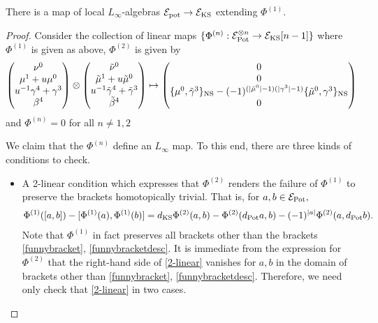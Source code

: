 \documentclass[11pt]{amsart}
\begin{document}
\begin{prop}
There is a map of local $L_{\infty}$-algebras $\mathcal E_{\rm pot}\to \mathcal E_{\rm KS}$ extending $\Phi^{(1)}$.
\end{prop}
\begin{proof}
  Consider the collection of linear maps $\{\Phi^{(n)}: \mathcal E_{\rm Pot}^{\otimes n}\to \mathcal E_{\rm KS}[n-1]\}$ where $\Phi^{(1)}$ is given as above, $\Phi^{{(2)}}$ is given by \[\begin{pmatrix}\nu^{0} \\ \mu^{1}+u\mu^{0} \\ u^{-1}\gamma^{4}+\gamma^{3} \\ \beta^{4}\end{pmatrix}\otimes \begin{pmatrix}\tilde{\nu}^{0} \\ \tilde{\mu}^{1}+u\tilde{\mu}^{0}\\ u^{-1}\tilde{\gamma}^{4}+\tilde{\gamma}^{3} \\ \tilde{\beta}^{4} \end{pmatrix}\mapsto \begin{pmatrix} 0 \\ 0 \\ \{\mu^{0},\tilde{\gamma}^{3}\}_{\rm NS}-(-1)^{(|\tilde \mu^{0}|-1)(|\gamma^{3}|-1)}\{\tilde{\mu}^{0},\gamma^{3}\}_{\rm NS} \\ 0\end{pmatrix}\] and $\Phi^{(n)}=0$ for all $n\neq 1,2$

  We claim that the $\Phi^{(n)}$ define an $L_{\infty}$ map. To this end, there are three kinds of conditions to check.
  \begin{itemize}
    \item A 2-linear condition which expresses that $\Phi^{(2)}$ renders the failure of $\Phi^{(1)}$ to preserve the brackets homotopically trivial. That is, for $a,b\in\mathcal E_{\rm Pot},$ \begin{align*}\Phi^{(1)}([a,b])-[\Phi^{(1)}(a),\Phi^{(1)}(b)]=d_{\rm KS}\Phi^{(2)}(a,b)-\Phi^{(2)}(d_{\rm Pot}a, b)-(-1)^{|a|}\Phi^{(2)}(a,d_{\rm Pot}b)\label{2-linear}.\end{align*} Note that $\Phi^{(1)}$ in fact preserves all brackets other than the brackets \ref{funnybracket}, \ref{funnybracketdesc}. It is immediate from the expression for $\Phi^{(2)}$ that the right-hand side of \ref{2-linear} vanishes for $a, b$ in the domain of brackets other than \ref{funnybracket}, \ref{funnybracketdesc}. Therefore, we need only check that \ref{2-linear} in two cases.


\end{itemize}
\end{proof}
\end{document}
